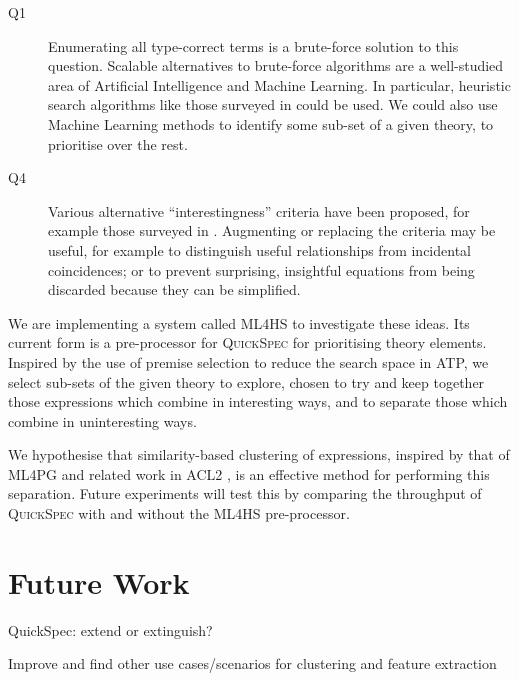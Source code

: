 \documentclass[]{article}
\begin{document}
\begin{description}
\item [Q1]
  Enumerating all type-correct terms is a brute-force solution to this question.
  Scalable alternatives to brute-force algorithms are a well-studied area of
  Artificial Intelligence and Machine Learning. In particular, heuristic
  search algorithms like those surveyed in \cite{blum2011hybrid} could be used.
  We could also use Machine Learning methods to identify some sub-set of a given
  theory, to prioritise over the rest.
\item [Q4]
  Various alternative ``interestingness'' criteria have been proposed, for
  example those surveyed in \cite{geng2006interestingness}. Augmenting or
  replacing the criteria may be useful, for example to distinguish useful
  relationships from incidental coincidences; or to prevent surprising,
  insightful equations from being discarded because they can be simplified.
\end{description}

We are implementing a system called \textsc{ML4HS} to investigate these ideas.
Its current form is a pre-processor for \textsc{QuickSpec} for prioritising
theory elements. Inspired by the use of premise selection
\cite{kuhlwein2012overview} to reduce the search space in ATP,
we select sub-sets of the given theory to explore, chosen to try and keep
together those expressions which combine in interesting ways, and to separate
those which combine in uninteresting ways.

We hypothesise that similarity-based clustering of expressions, inspired by that
of \textsc{ML4PG} \cite{journals/corr/abs-1212-3618} and related work in ACL2
\cite{heras2013proof}, is an effective method for performing this separation.
Future experiments will test this by comparing the throughput of
\textsc{QuickSpec} with and without the \textsc{ML4HS} pre-processor.



\section{Future Work}
\label{future}

\iffalse

QuickSpec: extend or extinguish?

Improve and find other use cases/scenarios for clustering and feature extraction
\end{document}
